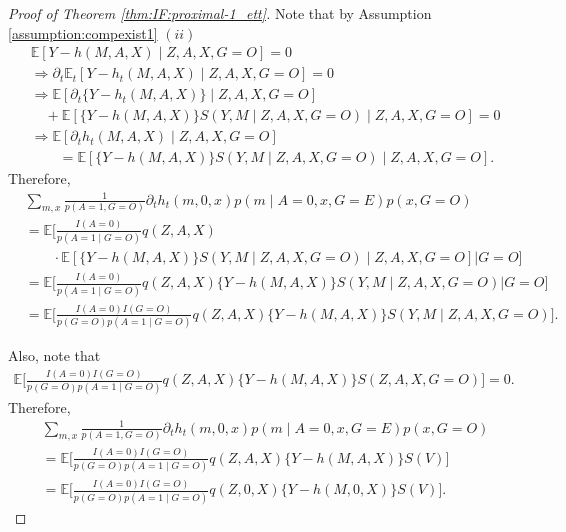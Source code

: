 \documentclass[10pt]{article}
\newcommand{\E}{\mathbb{E}}
\begin{document}
\begin{proof}[Proof of Theorem \ref{thm:IF:proximal-1_ett}]
Note that by Assumption \ref{assumption:compexist1} $(ii)$
\begin{align*}
&\E[Y-h(M,A,X)\mid Z,A,X,G=O]=0\\
&\Rightarrow\partial_t\E_t[Y-h_t(M,A,X)\mid Z,A,X,G=O]=0\\
&\Rightarrow\E[\partial_t\{Y-h_t(M,A,X)\}\mid Z,A,X,G=O]\\
&\quad+\E[\{Y-h(M,A,X)\}S(Y,M\mid Z,A,X,G=O)\mid Z,A,X,G=O]=0\\
&\Rightarrow\E[\partial_t h_t(M,A,X)\mid Z,A,X,G=O]\\
&\quad\quad=\E[\{Y-h(M,A,X)\}S(Y,M\mid Z,A,X,G=O)\mid Z,A,X,G=O].
\end{align*}
Therefore,
\begin{align*}
    &\sum_{m,x} \frac{1}{p(A=1,G=O)}\partial_t h_t(m,0,x)p(m\mid A=0,x,G=E)p(x,G=O) \\
    &=\E\Big[ \frac{I(A=0)}{p(A=1\mid G=O)}q(Z,A,X)\\
    &\quad\quad \cdot\E[\{Y-h(M,A,X)\}S(Y,M\mid Z,A,X,G=O)\mid Z,A,X,G=O]\Big| G=O\Big]\\
    &=\E\Big[ \frac{I(A=0)}{p(A=1\mid G=O)}q(Z,A,X)\{Y-h(M,A,X)\}S(Y,M\mid Z,A,X,G=O)\Big| G=O\Big]\\
    &=\E\Big[ \frac{I(A=0)I(G=O)}{p(G=O)p(A=1\mid G=O)}q(Z,A,X)\{Y-h(M,A,X)\}S(Y,M\mid Z,A,X,G=O)\Big].
\end{align*}

Also, note that
\begin{align*}
    \E\Big[ \frac{I(A=0)I(G=O)}{p(G=O)p(A=1\mid G=O)}q(Z,A,X)\{Y-h(M,A,X)\}S(Z,A,X,G=O)\Big]=0.
\end{align*}
Therefore,
\begin{equation}
    \label{eq:IF:proxy-ett2-2}
    \begin{aligned}
        &\sum_{m,x} \frac{1}{p(A=1,G=O)}\partial_t h_t(m,0,x)p(m\mid A=0,x,G=E)p(x,G=O) \\
        &=\E\Big[ \frac{I(A=0)I(G=O)}{p(G=O)p(A=1\mid G=O)}q(Z,A,X)\{Y-h(M,A,X)\}S(V)\Big]\\
        &=\E\Big[ \frac{I(A=0)I(G=O)}{p(G=O)p(A=1\mid G=O)}q(Z,0,X)\{Y-h(M,0,X)\}S(V)\Big].
    \end{aligned}
\end{equation}


\end{proof}
\end{document}
